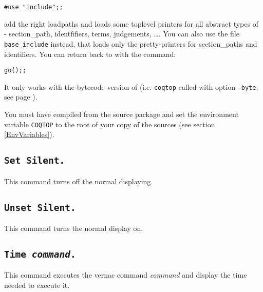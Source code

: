 \begin{flushleft}
\begin{verbatim}
#use "include";;
\end{verbatim}
\end{flushleft}

\noindent add the right loadpaths and loads some toplevel printers for
all abstract types of \Coq - section\_path, identfifiers, terms, judgements,
\dots. You can also use the file \texttt{base\_include} instead,
that loads only the pretty-printers for section\_paths and
identifiers.
You can return back to \Coq{} with the command: 

\begin{flushleft}
\begin{verbatim}
go();;
\end{verbatim}
\end{flushleft}

\begin{Warnings}
\item It only works with the bytecode version of {\Coq} (i.e. {\tt coqtop} called with option {\tt -byte}, see page \pageref{binary-images}).
\item You must have compiled {\Coq} from the source package and set the
  environment variable \texttt{COQTOP} to the root of your copy of the sources (see section \ref{EnvVariables}).
\end{Warnings}

\subsection{\tt Set Silent.}
\label{Begin-Silent}
This command turns off the normal displaying.

\subsection{\tt Unset Silent.}
This command turns the normal display on.

\subsection{\tt Time \textrm{\textsl{command}}.}
\label{time}
This command executes the vernac command \textrm{\textsl{command}}
and display the time needed to execute it.





